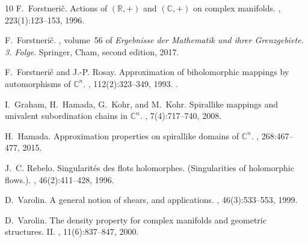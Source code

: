\documentclass[12pt]{amsart}
\theoremstyle{definition}
\numberwithin{equation}{section}
\numberwithin{figure}{section}
\numberwithin{equation}{section}
\begin{document}
\begin{thebibliography}{10}
F.~Forstneri\v{c}.
\newblock Actions of {$(\mathbb R,+)$} and {$(\mathbb C,+)$} on complex
  manifolds.
, 223(1):123--153, 1996.

F.~Forstneri\v{c}.
, volume~56 of {\em Ergebnisse der Mathematik und ihrer
  Grenzgebiete. 3. Folge}.
\newblock Springer, Cham, second edition, 2017.

F.~Forstneri\v{c} and J.-P. Rosay.
\newblock Approximation of biholomorphic mappings by automorphisms of
  {${\mathbb C}^n$}.
, 112(2):323--349, 1993.
.

I.~Graham, H.~Hamada, G.~Kohr, and M.~Kohr.
\newblock Spirallike mappings and univalent subordination chains in {{\(\mathbb
  C^{n}\)}}.
, 7(4):717--740, 2008.

H.~Hamada.
\newblock Approximation properties on spirallike domains of
  {{\(\mathbb{C}^n\)}}.
, 268:467--477, 2015.

J.~C. Rebelo.
\newblock Singularit{\'e}s des flots holomorphes. ({Singularities} of
  holomorphic flows.).
, 46(2):411--428, 1996.

D.~Varolin.
\newblock A general notion of shears, and applications.
, 46(3):533--553, 1999.

D.~Varolin.
\newblock The density property for complex manifolds and geometric structures.
  {II}.
, 11(6):837--847, 2000.

\end{thebibliography}

\end{document}
